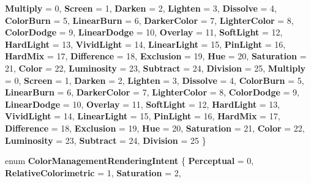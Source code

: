 \begin{DoxyCompactItemize}
{\bfseries Multiply} = 0, 
{\bfseries Screen} = 1, 
\newline
{\bfseries Darken} = 2, 
{\bfseries Lighten} = 3, 
{\bfseries Dissolve} = 4, 
{\bfseries Color\+Burn} = 5, 
\newline
{\bfseries Linear\+Burn} = 6, 
{\bfseries Darker\+Color} = 7, 
{\bfseries Lighter\+Color} = 8, 
{\bfseries Color\+Dodge} = 9, 
\newline
{\bfseries Linear\+Dodge} = 10, 
{\bfseries Overlay} = 11, 
{\bfseries Soft\+Light} = 12, 
{\bfseries Hard\+Light} = 13, 
\newline
{\bfseries Vivid\+Light} = 14, 
{\bfseries Linear\+Light} = 15, 
{\bfseries Pin\+Light} = 16, 
{\bfseries Hard\+Mix} = 17, 
\newline
{\bfseries Difference} = 18, 
{\bfseries Exclusion} = 19, 
{\bfseries Hue} = 20, 
{\bfseries Saturation} = 21, 
\newline
{\bfseries Color} = 22, 
{\bfseries Luminosity} = 23, 
{\bfseries Subtract} = 24, 
{\bfseries Division} = 25, 
\newline
{\bfseries Multiply} = 0, 
{\bfseries Screen} = 1, 
{\bfseries Darken} = 2, 
{\bfseries Lighten} = 3, 
\newline
{\bfseries Dissolve} = 4, 
{\bfseries Color\+Burn} = 5, 
{\bfseries Linear\+Burn} = 6, 
{\bfseries Darker\+Color} = 7, 
\newline
{\bfseries Lighter\+Color} = 8, 
{\bfseries Color\+Dodge} = 9, 
{\bfseries Linear\+Dodge} = 10, 
{\bfseries Overlay} = 11, 
\newline
{\bfseries Soft\+Light} = 12, 
{\bfseries Hard\+Light} = 13, 
{\bfseries Vivid\+Light} = 14, 
{\bfseries Linear\+Light} = 15, 
\newline
{\bfseries Pin\+Light} = 16, 
{\bfseries Hard\+Mix} = 17, 
{\bfseries Difference} = 18, 
{\bfseries Exclusion} = 19, 
\newline
{\bfseries Hue} = 20, 
{\bfseries Saturation} = 21, 
{\bfseries Color} = 22, 
{\bfseries Luminosity} = 23, 
\newline
{\bfseries Subtract} = 24, 
{\bfseries Division} = 25
 \}
\item 
\mbox{\label{namespace_microsoft_1_1_graphics_1_1_canvas_1_1_effects_a46519f571ff01b1f57ee3699fc97a7ce}} 
enum {\bfseries Color\+Management\+Rendering\+Intent} \{ \newline
{\bfseries Perceptual} = 0, 
{\bfseries Relative\+Colorimetric} = 1, 
{\bfseries Saturation} = 2, 

\end{DoxyCompactItemize}
